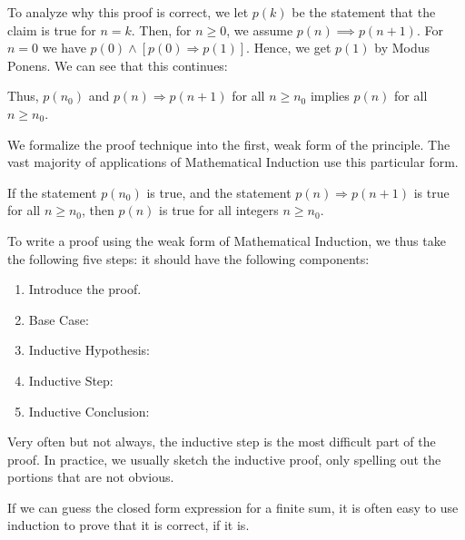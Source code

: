 To analyze why this proof is correct,
we let $p(k)$ be the statement that the claim is true for $n=k$.
Then, for $n \geq 0$, we assume $p(n) \implies p(n+1)$.
For $n=0$ we have $p(0) \wedge [p(0) \Rightarrow p(1)]$.
Hence, we get $p(1)$ by Modus Ponens.
We can see that this continues:
\practice

Thus, $p(n_0)$ and $p(n) \Rightarrow p(n+1)$ for all $n \geq n_0$
implies $p(n)$ for all $n \geq n_0$.

We formalize the proof technique into the first, weak form of
the principle.
The vast majority of applications of Mathematical Induction
use this particular form.

\begin{definition}
    If the statement $p(n_0)$ is true, and the
    statement $p(n) \Rightarrow p(n+1)$ is true for all $n \geq n_0$,
    then $p(n)$ is true for all integers $n \geq n_0$.
\end{definition}

To write a proof using the weak form of Mathematical Induction,
we thus take the following five steps:
it should have the following components:
\begin{enumerate}
    \item Introduce the proof.
    \item Base Case:            %
    \item Inductive Hypothesis: %
    \item Inductive Step:       %
    \item Inductive Conclusion: %
\end{enumerate}
Very often but not always, the inductive step is the most
difficult part of the proof.
In practice, we usually sketch the inductive proof,
only spelling out the portions that are not obvious.

If we can guess the closed form expression for a finite sum,
it is often easy to use induction to prove that it is correct,
if it is.

